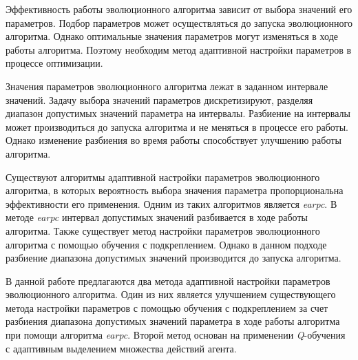 \startprefacepage

Эффективность работы эволюционного алгоритма зависит от выбора значений его параметров. Подбор параметров может осуществляться до запуска эволюционного алгоритма. Однако оптимальные значения параметров могут изменяться в ходе работы алгоритма. Поэтому необходим метод адаптивной настройки параметров в процессе оптимизации. 

Значения параметров эволюционного алгоритма лежат в заданном интервале значений. Задачу выбора значений параметров дискретизируют, разделяя диапазон допустимых значений параметра на интервалы. Разбиение на интервалы может производиться до запуска алгоритма и не меняться в процессе его работы. Однако изменение разбиения во время работы способствует улучшению работы алгоритма.

Существуют алгоритмы адаптивной настройки параметров эволюционного алгоритма, в которых вероятность выбора значения параметра пропорциональна эффективности его применения. Одним из таких алгоритмов является \textit{earpc}. В методе \textit{earpc} интервал допустимых значений разбивается в ходе работы алгоритма. Также существует метод настройки параметров эволюционного алгоритма с помощью обучения с подкреплением. Однако в данном подходе разбиение диапазона допустимых значений производится до запуска алгоритма. 

В данной работе предлагаются два метода адаптивной настройки параметров эволюционного алгоритма. Один из них является улучшением существующего метода настройки параметров с помощью обучения с подкреплением за счет разбиения диапазона допустимых значений параметра в ходе работы алгоритма при помощи алгоритма \textit{earpc}. Второй метод основан на применении  \textit{Q}-обучения с адаптивным выделением множества действий агента. 